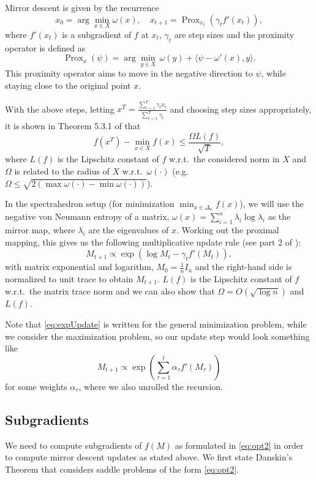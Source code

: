 \documentclass{article}
\DeclareMathOperator{\Prox}{Prox}
\begin{document}
Mirror descent is given by the recurrence
\[ x_0 = \arg\min_{x \in X} \omega(x), \quad x_{t+1} = \Prox_{x_t}(\gamma_t f'(x_t)), \]
where $f'(x_t)$ is a subgradient of $f$ at $x_t$, $\gamma_t$ are step sizes and the proximity operator is defined as 
\[ \Prox_{x}(\psi ) = \arg\min_{y \in X} \, \omega(y) + \langle \psi - \omega'(x), y \rangle. \]
This proximity operator aims to move in the negative direction to $\psi$, while staying close to the original point $x$.

With the above steps, letting $x^T = \frac{\sum_{t=1}^T \gamma_t x_t}{\sum_{t=1}^T \gamma_t}$ and choosing step sizes appropriately, it is shown in Theorem 5.3.1 of \cite{lectures} that
\[ f(x^T) - \min_{x \in X} f(x) \leq \frac{\Omega L(f)}{\sqrt{T}}, \]
where $L(f)$ is the Lipschitz constant of $f$ w.r.t.\ the considered norm in $X$ and $\Omega$ is related to the radius of $X$ w.r.t.\ $\omega(\cdot)$ (e.g.\ $\Omega \leq \sqrt{2 (\max \omega(\cdot) - \min \omega(\cdot))}$).


In the spectrahedron setup (for minimization $\min_{x \in \Delta_n} f(x)$), we will use the negative von Neumann entropy of a matrix, $\omega(x) = \sum_{i=1}^n \lambda_i \log \lambda_i$ as the mirror map, where $\lambda_i$ are the eigenvalues of $x$. Working out the proximal mapping, this gives us the following multiplicative update rule (see part 2 of \cite{blog}):
\begin{equation}\label{eq:expUpdate}
  M_{t+1} \propto \exp \left( \log M_t - \gamma_t f'(M_t) \right),
\end{equation}
with matrix exponential and logarithm, $M_0 = \frac{1}{n} I_n$ and the right-hand side is normalized to unit trace to obtain $M_{t+1}$. $L(f)$ is the Lipschitz constant of $f$ w.r.t.\ the matrix trace norm and we can also show that $\Omega = O(\sqrt{\log n})$ and $L(f)$. 

Note that \eqref{eq:expUpdate} is written for the general minimization problem, while we consider the maximization problem, so our update step would look something like
\[ M_{t+1} \propto \exp \left( \sum_{\tau=1}^t \alpha_\tau f'(M_\tau) \right) \]
for some weights $\alpha_\tau$, where we also unrolled the recursion.


\subsection*{Subgradients}

We need to compute subgradients of $f(M)$ as formulated in \eqref{eq:opt2} in order to compute mirror descent updates as stated above. We first state Danskin's Theorem \cite{danskin} that considers saddle problems of the form \eqref{eq:opt2}.
\end{document}
